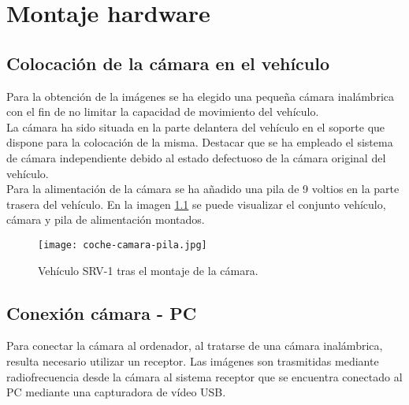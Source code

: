 

\chapter{Montaje hardware}
\label{chap:dispositivos-hardware}

\section{Colocación de la cámara en el vehículo}

Para la obtención de la imágenes se ha elegido una pequeña cámara inalámbrica con el fin de no limitar la capacidad de movimiento del vehículo.\\

 La cámara ha sido situada en la parte delantera del vehículo en el soporte que dispone para la colocación de la misma. Destacar que se ha empleado el sistema de cámara independiente debido al estado defectuoso de la cámara original del vehículo.\\

Para la alimentación de la cámara se ha añadido una pila de 9 voltios en la parte trasera del vehículo. En la imagen \ref{fig:coche-camara-pila} se puede visualizar el conjunto vehículo, cámara y pila de alimentación montados.\\

\begin{figure}[H]
  \begin{center}
    \texttt{[image: coche-camara-pila.jpg]}
  \end{center}
  \caption{Vehículo SRV-1 tras el montaje de la cámara.}
  \label{fig:coche-camara-pila}
\end{figure}


\section{Conexión cámara - PC}

Para conectar la cámara al ordenador, al tratarse de una cámara inalámbrica, resulta necesario utilizar un receptor. Las imágenes son trasmitidas mediante radiofrecuencia desde la cámara al sistema receptor que se encuentra conectado al PC mediante una capturadora de vídeo USB.\\

